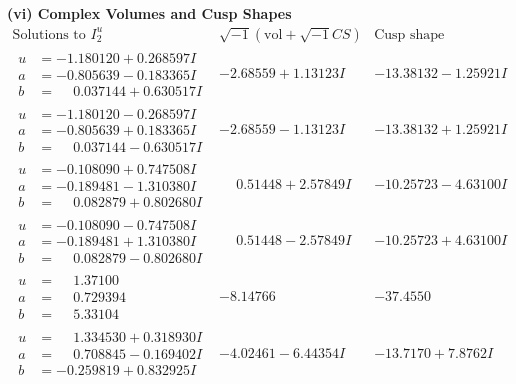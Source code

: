 \documentclass[1p]{elsarticle_modified}
\theoremstyle{definition}
\newcommand{\I}{\sqrt{-1}}
\begin{document}
\newpage\flushleft \textbf{(vi) Complex Volumes and Cusp Shapes}
$$\begin{array}{c|c|c}  
\text{Solutions to }I^u_{2}& \I (\text{vol} + \sqrt{-1}CS) & \text{Cusp shape}\\
 \hline 
\begin{aligned}
u &= -1.180120 + 0.268597 I \\
a &= -0.805639 - 0.183365 I \\
b &= \phantom{-}0.037144 + 0.630517 I\end{aligned}
 & -2.68559 + 1.13123 I & -13.38132 - 1.25921 I \\ \hline\begin{aligned}
u &= -1.180120 - 0.268597 I \\
a &= -0.805639 + 0.183365 I \\
b &= \phantom{-}0.037144 - 0.630517 I\end{aligned}
 & -2.68559 - 1.13123 I & -13.38132 + 1.25921 I \\ \hline\begin{aligned}
u &= -0.108090 + 0.747508 I \\
a &= -0.189481 - 1.310380 I \\
b &= \phantom{-}0.082879 + 0.802680 I\end{aligned}
 & \phantom{-}0.51448 + 2.57849 I & -10.25723 - 4.63100 I \\ \hline\begin{aligned}
u &= -0.108090 - 0.747508 I \\
a &= -0.189481 + 1.310380 I \\
b &= \phantom{-}0.082879 - 0.802680 I\end{aligned}
 & \phantom{-}0.51448 - 2.57849 I & -10.25723 + 4.63100 I \\ \hline\begin{aligned}
u &= \phantom{-}1.37100\phantom{ +0.000000I} \\
a &= \phantom{-}0.729394\phantom{ +0.000000I} \\
b &= \phantom{-}5.33104\phantom{ +0.000000I}\end{aligned}
 & -8.14766\phantom{ +0.000000I} & -37.4550\phantom{ +0.000000I} \\ \hline\begin{aligned}
u &= \phantom{-}1.334530 + 0.318930 I \\
a &= \phantom{-}0.708845 - 0.169402 I \\
b &= -0.259819 + 0.832925 I\end{aligned}
 & -4.02461 - 6.44354 I & -13.7170 + 7.8762 I \\ \hline\begin{aligned}

\end{aligned}
\end{array}$$
\end{document}
